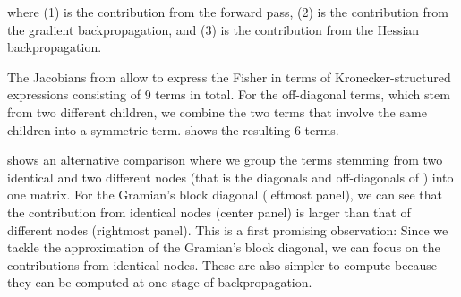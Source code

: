 where (1) is the contribution from the forward pass, (2) is the contribution from the gradient backpropagation, and (3) is the contribution from the Hessian backpropagation.



The Jacobians from  allow to express the Fisher in terms of Kronecker-structured expressions consisting of 9 terms in total.
For the off-diagonal terms, which stem from two different children, we combine the two terms that involve the same children into a symmetric term.
 shows the resulting 6 terms.



 shows an alternative comparison where we group the terms stemming from two identical and two different nodes (that is the diagonals and off-diagonals of ) into one matrix.
For the Gramian's block diagonal (leftmost panel), we can see that the contribution from identical nodes (center panel) is larger than that of different nodes (rightmost panel).
This is a first promising observation: Since we tackle the approximation of the Gramian's block diagonal, we can focus on the contributions from identical nodes.
These are also simpler to compute because they can be computed at one stage of backpropagation.

